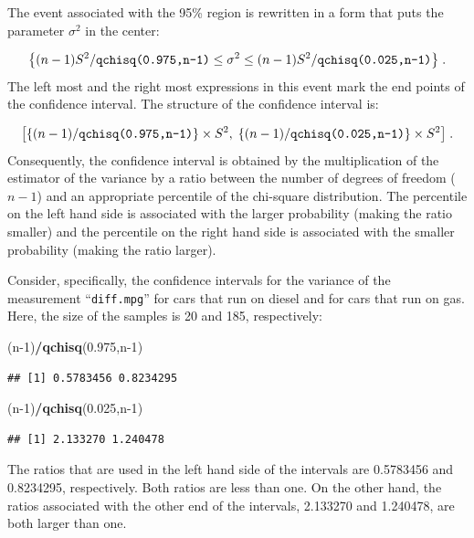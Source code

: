 \documentclass[
]{krantz}
\makeatletter
\newenvironment{Shaded}{\begin{snugshade}}{\end{snugshade}}
\newcommand{\DecValTok}[1]{\textcolor[rgb]{0.00,0.00,0.81}{#1}}
\newcommand{\FloatTok}[1]{\textcolor[rgb]{0.00,0.00,0.81}{#1}}
\newcommand{\KeywordTok}[1]{\textcolor[rgb]{0.13,0.29,0.53}{\textbf{#1}}}
\newcommand{\NormalTok}[1]{#1}
\newcommand{\OperatorTok}[1]{\textcolor[rgb]{0.81,0.36,0.00}{\textbf{#1}}}
\newenvironment{kframe}{%
\medskip{}
\setlength{\fboxsep}{.8em}
 \def\at@end@of@kframe{}%
 \ifinner\ifhmode%
  \def\at@end@of@kframe{\end{minipage}}%
  \begin{minipage}{\columnwidth}%
 \fi\fi%
 \def\FrameCommand##1{\hskip\@totalleftmargin \hskip-\fboxsep
 \colorbox{shadecolor}{##1}\hskip-\fboxsep
     \hskip-\linewidth \hskip-\@totalleftmargin \hskip\columnwidth}%
 \MakeFramed {\advance\hsize-\width
   \@totalleftmargin\z@ \linewidth\hsize
   \@setminipage}}%
 {\par\unskip\endMakeFramed%
 \at@end@of@kframe}
\renewenvironment{Shaded}{\begin{kframe}}{\end{kframe}}
\theoremstyle{definition}
\theoremstyle{definition}
\theoremstyle{definition}
\theoremstyle{remark}
\makeatother
\begin{document}
The event associated with the 95\% region is rewritten in a form that
puts the parameter \(\sigma^2\) in the center:

\[\big\{(n-1)S^2/\mbox{\texttt{qchisq(0.975,n-1)}} \leq  \sigma^2  \leq (n-1)S^2/\mbox{\texttt{qchisq(0.025,n-1)}}\big\}\;.\]
The left most and the right most expressions in this event mark the end
points of the confidence interval. The structure of the confidence
interval is:

\[\big[\{(n-1)/\mbox{\texttt{qchisq(0.975,n-1)}}\}\times S^2,\;\{(n-1)/\mbox{\texttt{qchisq(0.025,n-1)}}\}\times S^2\big]\;.\]
Consequently, the confidence interval is obtained by the multiplication
of the estimator of the variance by a ratio between the number of
degrees of freedom (\(n-1\)) and an appropriate percentile of the
chi-square distribution. The percentile on the left hand side is
associated with the larger probability (making the ratio smaller) and
the percentile on the right hand side is associated with the smaller
probability (making the ratio larger).

Consider, specifically, the confidence intervals for the variance of the
measurement ``\texttt{diff.mpg}'' for cars that run on diesel and for cars that
run on gas. Here, the size of the samples is 20 and 185, respectively:

\begin{Shaded}
\begin{Highlighting}[]
\NormalTok{(n}\DecValTok{-1}\NormalTok{)}\OperatorTok{/}\KeywordTok{qchisq}\NormalTok{(}\FloatTok{0.975}\NormalTok{,n}\DecValTok{-1}\NormalTok{)}
\end{Highlighting}
\end{Shaded}

\begin{verbatim}
## [1] 0.5783456 0.8234295
\end{verbatim}

\begin{Shaded}
\begin{Highlighting}[]
\NormalTok{(n}\DecValTok{-1}\NormalTok{)}\OperatorTok{/}\KeywordTok{qchisq}\NormalTok{(}\FloatTok{0.025}\NormalTok{,n}\DecValTok{-1}\NormalTok{)}
\end{Highlighting}
\end{Shaded}

\begin{verbatim}
## [1] 2.133270 1.240478
\end{verbatim}

The ratios that are used in the left hand side of the intervals are
0.5783456 and 0.8234295, respectively. Both ratios are less than one. On
the other hand, the ratios associated with the other end of the
intervals, 2.133270 and 1.240478, are both larger than one.
\end{document}

